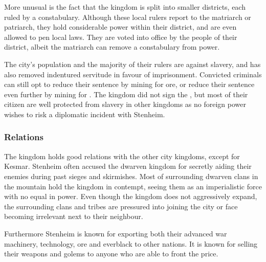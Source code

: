 More unusual is the fact that the kingdom is split into smaller districts,
each ruled by a constabulary. Although these local rulers report to the
matriarch or patriarch, they hold considerable power within their district,
and are even allowed to pen local laws. They are voted into office by the
people of their district, albeit the matriarch can remove a constabulary from
power.

The city's population and the majority of their rulers are against slavery,
and has also removed indentured servitude in favour of imprisonment. Convicted
criminals can still opt to reduce their sentence by mining for ore, or reduce
their sentence even further by mining for . The kingdom
did not sign the , but most of their citizen are
well protected from slavery in other kingdoms as no foreign power wishes to
risk a diplomatic incident with Stenheim.

\subsubsection{Relations}

The kingdom holds good relations with the other city kingdoms, except for
Kesmar. Stenheim often accused the dwarven kingdom for secretly aiding their
enemies during past sieges and skirmishes. Most of surrounding dwarven clans
in the mountain hold the kingdom in contempt, seeing them as an imperialistic
force with no equal in power. Even though the kingdom does not aggressively
expand, the surrounding clans and tribes are pressured into joining the city
or face becoming irrelevant next to their neighbour.

Furthermore Stenheim is known for exporting both their advanced war machinery,
technology, ore and everblack to other nations. It is known for selling their
weapons and golems to anyone who are able to front the price.
